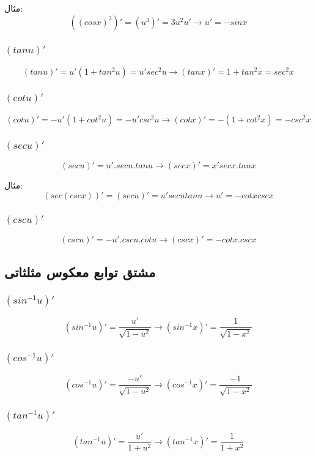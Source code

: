 مثال:
\[ ((cos x)^3)' = (u^3)' = 3u^2u' \to u' = -sin x \]

\subsubsection{$(tan u)'$}
\[ (tan u)' = u'(1+tan^2u) = u'sec^2u \to (tan x)' = 1+tan^2 x = sec^2 x \]

\subsubsection{$(cot u)'$}
\[ (cot u)' = -u'(1+cot^2u) = -u'csc^2u \to (cot x)' = -(1+cot^2x) = -csc^2x \]

\subsubsection{$(sec u)'$}
\[ (sec u)' = u'.sec u.tan u \to (sec x)' = x'sec x.tan x \]

مثال:
\[ (sec(csc x))' = (sec u)' = u'sec utan u \to u' = -cot x csc x \]


\subsubsection{$(csc u)'$}
\[ (csc u)' = -u'.csc u.cot u \to (csc x)' = -cot x.csc x \]


\subsection{مشتق توابع معکوس مثلثاتی}
\subsubsection{$(sin^{-1} u)'$}
\[ (sin^{-1} u)' = \frac{u'}{\sqrt{1-u^2}} \to (sin^{-1}x)' = \frac{1}{\sqrt{1-x^2}} \]

\subsubsection{$(cos^{-1} u)'$}
\[ (cos^{-1} u)' = \frac{-u'}{\sqrt{1-u^2}} \to (cos^{-1}x)' = \frac{-1}{\sqrt{1-x^2}} \]

\subsubsection{$(tan^{-1} u)'$}
\[ (tan^{-1} u)' = \frac{u'}{1+u^2} \to (tan^{-1}x)' = \frac{1}{1+x^2} \]

